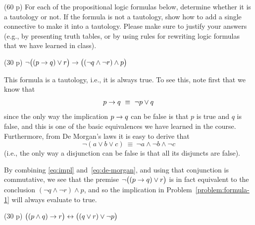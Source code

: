 \documentclass{jn-pset}
\begin{document}
\begin{problem}%
  \label{problem:logic}%
  (60 p)  
  For each of the propositional logic formulas below,
  determine whether it is a tautology or not.
  If the formula is not a tautology, show how to
  add a single connective to make it into a tautology.
  Please make sure to justify your answers
  (e.g., by presenting truth tables, or by using rules for rewriting logic formulas
  that we have learned in class).

  \begin{subproblem}%
    \label{problem:formula-1}%
    {(30 p)}
    {\ignorespaces}
    $
    \lnot \bigl(
    ( p \rightarrow q) \lor r
    \bigr)
    \rightarrow
    \bigl(
    (\lnot q \land \lnot r) \land p
    \bigr)
    $
  \end{subproblem}

\begin{solution}
  This formula is a tautology, i.e., it is always true.
  To see this, note first that we know that
  \begin{equation}
    \label{eq:impl}
    p \rightarrow q
    \ \equiv \
    \lnot p \lor q
  \end{equation}
  since the only way the implication
  $p \rightarrow q$
  can be false is that $p$ is true and $q$ is false,
  and this is one of the basic equivalences we have learned in the course.
  Furthermore, from De Morgan's laws it is easy to derive that
  \begin{equation}
    \label{eq:de-morgan}
    \lnot ( a \lor b \lor c)
    \ \equiv \
    \lnot a \land \lnot b \land \lnot c
  \end{equation}
  (i.e., the only way a disjunction can be false is that all its
  disjuncts are false).
  
  By combining
  \eqref{eq:impl}
  and~\eqref{eq:de-morgan},
  and using that conjunction is commutative, we see that the premise
  $
  \lnot \bigl(
  ( p \rightarrow q) \lor r
  \bigr)
  $
  is in fact equivalent to the conclusion
  $
  (\lnot q \land \lnot r) \land p
  $,
  and so the implication
  in Problem~\ref{problem:formula-1}
  will always evaluate to true.
\end{solution}

  \begin{subproblem}
    {(30 p)}
    {\ignorespaces}
    $
    \bigl(
    (p \land q) \rightarrow r
    \bigr)
    \leftrightarrow
    \bigl(
    (q \lor r) \lor \lnot p
    \bigr)
    $    
  \end{subproblem}


\end{problem}
\end{document}
